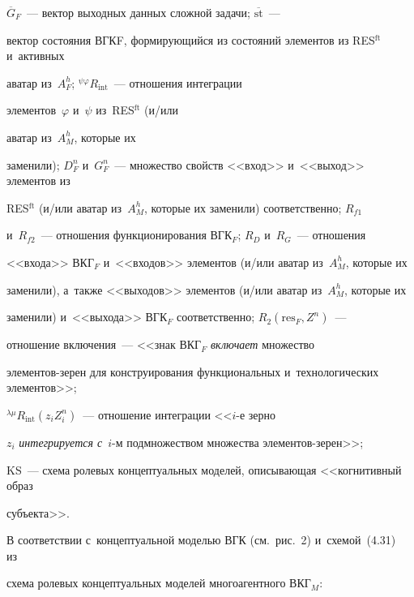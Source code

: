 $\overline{G}_F$~--- вектор выходных данных сложной задачи; $\overline{\mathrm{st}}$~--- 


вектор состояния ВГКF, формирующийся из состояний элементов из RES$^{\mathrm{ft}}$ и~активных 


аватар из~$A_F^h$; ${}^{\psi\varphi}R_{\mathrm{int}}$~--- отношения интеграции 


элементов~$\varphi$ и~$\psi$ из~RES$^{\mathrm{ft}}$ (и\!/\!или 


аватар из~$A_M^h$, которые их 


заменили); $D_F^n$ и~$G_F^n$~--- множество свойств <<вход>> и~<<выход>> элементов из 


RES$^{\mathrm{ft}}$ (и\!/\!или аватар из~$A_M^h$, которые их заменили) соответственно; $R_{f1}$ 


и~$R_{f2}$~--- отношения функционирования ВГК$_F$; $R_D$ и~$R_G$~--- отношения 


<<входа>> ВКГ$_F$ и~<<входов>> элементов (и\!/\!или аватар из~$A_M^h$, которые их 


заменили), а~также <<выходов>> элементов (и\!/\!или аватар из~$A_M^h$, которые их 


заменили) и~<<выхода>> ВГК$_F$ соответственно; $R_2(\mathrm{res}_F, Z^n)$~--- 


отношение включения~--- <<знак ВКГ$_F$ \textit{включает} множество 


эле\-мен\-тов-зе\-рен для конструирования функциональных и~технологических элементов>>; 


${}^{\lambda\mu}R_{\mathrm{int}}(z_i Z_i^n)$~--- отношение интеграции <<$i$-е зерно 


$z_i$ \textit{интегрируется с}~$i$-м подмножеством множества эле\-мен\-тов-зе\-рен>>; 


KS~--- схема ролевых концептуальных моделей, описывающая <<когнитивный образ 


субъекта>>.


  


  В соответствии с~концептуальной моделью ВГК (см.\ рис.~2) и~схемой~(4.31) из~\cite{2-rum} 


схема ролевых концептуальных моделей многоагентного ВКГ$_M$:


